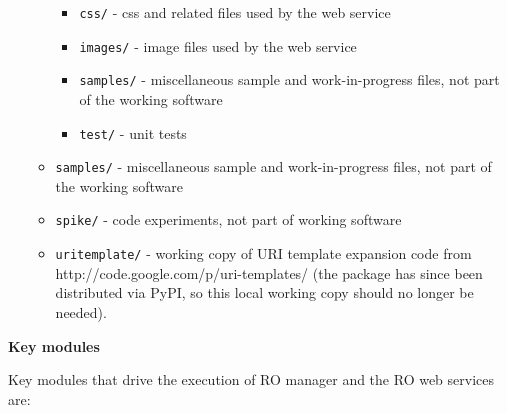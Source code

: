 \begin{itemize}
\begin{itemize}
\begin{itemize}
\item \texttt{css/} - css and related files used by the web service
\item \texttt{images/} - image files used by the web service
\item \texttt{samples/} - miscellaneous sample and work-in-progress files, not part of the working software
\item \texttt{test/} - unit tests
\end{itemize}


\item \texttt{samples/} - miscellaneous sample and work-in-progress files, not part of the working software
\item \texttt{spike/} - code experiments, not part of working software
\item \texttt{uritemplate/} - working copy of URI template expansion code from http://code.google.com/p/uri-templates/ (the package has since been distributed via PyPI, so this local working copy should no longer be needed).
\end{itemize}


\end{itemize}

\textbf{Key modules}
\label{keymodules}

Key modules that drive the execution of RO manager and the RO web services are:

